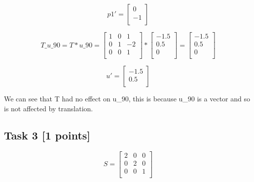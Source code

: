 \documentclass{article}
\begin{document}
\[
    p1' =
    \begin{bmatrix}
        0  \\
        -1 \\
    \end{bmatrix}
\]



\[
    T\_u\_90 = T * u\_90 =
    \begin{bmatrix}
        1 & 0 & 1  \\
        0 & 1 & -2 \\
        0 & 0 & 1  \\
    \end{bmatrix}
    *
    \begin{bmatrix}
        -1.5 \\
        0.5  \\
        0    \\
    \end{bmatrix}
    =
    \begin{bmatrix}
        -1.5 \\
        0.5  \\
        0    \\
    \end{bmatrix}
\]


\[
    u' =
    \begin{bmatrix}
        -1.5 \\
        0.5  \\
    \end{bmatrix}
\]



We can see that T had no effect on u\_90, this is because u\_90 is a vector and so is not affected by translation.

\subsection*{Task 3 [1 points]}

\[
    S =
    \begin{bmatrix}
        2 & 0 & 0 \\
        0 & 2 & 0 \\
        0 & 0 & 1 \\
    \end{bmatrix}
\]
\end{document}
